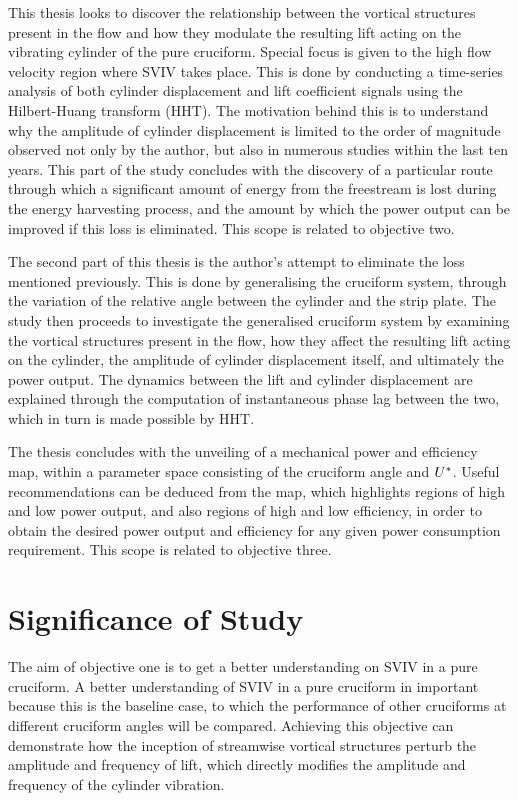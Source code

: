 \documentclass[oneside]{utmthesis}
\begin{document}
This thesis looks to discover the relationship between the vortical structures present in the flow and how they modulate the resulting lift acting on the vibrating cylinder of the pure cruciform. Special focus is given to the high flow velocity region where SVIV takes place. This is done by conducting a time-series analysis of both cylinder displacement and lift coefficient signals using the Hilbert-Huang transform (HHT). The motivation behind this is to understand why the amplitude of cylinder displacement is limited to the order of magnitude observed not only by the author, but also in numerous studies within the last ten years. This part of the study concludes with the discovery of a particular route through which a significant amount of energy from the freestream is lost during the energy harvesting process, and the amount by which the power output can be improved if this loss is eliminated. This scope is related to objective two.

The second part of this thesis is the author's attempt to eliminate the loss mentioned previously. This is done by generalising the cruciform system, through the variation of the relative angle between the cylinder and the strip plate. The study then proceeds to investigate the generalised cruciform system by examining the vortical structures present in the flow, how they affect the resulting lift acting on the cylinder, the amplitude of cylinder displacement itself, and ultimately the power output. The dynamics between the lift and cylinder displacement are explained through the computation of instantaneous phase lag between the two, which in turn is made possible by HHT.

The thesis concludes with the unveiling of a mechanical power and efficiency map, within a parameter space consisting of the cruciform angle and $U^{*}$. Useful recommendations can be deduced from the map, which highlights regions of high and low power output, and also regions of high and low efficiency, in order to obtain the desired power output and efficiency for any given power consumption requirement. This scope is related to objective three.

\section{Significance of Study} \label{sec:signStudy}

\vspace{\baselineskip}

The aim of objective one is to get a better understanding on SVIV in a pure cruciform. A better understanding of SVIV in a pure cruciform in important because this is the baseline case, to which the performance of other cruciforms at different cruciform angles will be compared. Achieving this objective can demonstrate how the inception of streamwise vortical structures perturb the amplitude and frequency of lift, which directly modifies the amplitude and frequency of the cylinder vibration.
\end{document}
